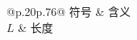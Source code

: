 \begin{XDUGlossary}{@{}p{.20\linewidth}p{.76\linewidth}@{}}
符号 & 含义 \\
\endhead
\(L\) & 长度 \\
\end{XDUGlossary}
